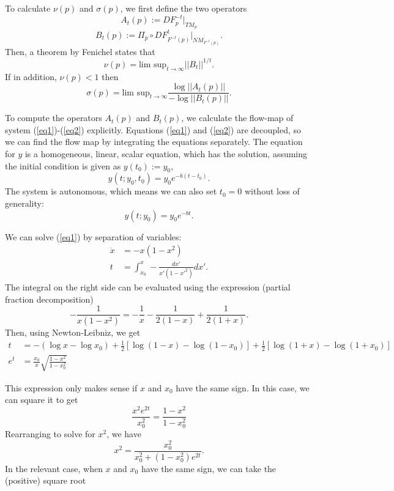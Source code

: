 \documentclass[a4paper,11pt,pdftex]{article}
\begin{document}
To calculate $\nu(p)$ and $\sigma(p)$, we first define the two operators
\begin{equation}
    A_t(p) := DF_p^{-t}|_{TM_p}
\end{equation}
\begin{equation}
    B_t(p) := \Pi_p \circ DF_{F^{-t}(p)}^{t}|_{NM_{F^{-t}(p)}}.
\end{equation}
Then, a theorem by Fenichel states that
\begin{equation}
    \label{eqnu}
    \nu(p) = \text{lim sup}_{t\to \infty} ||B_t||^{1/t}.
\end{equation}
If in addition, $\nu(p)<1$ then
\begin{equation}
    \label{eqsigma}
    \sigma(p) = \text{lim sup}_{t\to \infty} \frac{\log ||A_t(p)||}{-\log ||B_t(p)||}.
\end{equation}

To compute the operators $A_t(p)$ and $B_t(p)$, we calculate the flow-map of system (\ref{eq1})-(\ref{eq2}) explicitly. Equations (\ref{eq1}) and (\ref{eq2}) are decoupled, so we can find the flow map by integrating the equations separately. The equation for $y$ is a homogeneous, linear, scalar equation, which has the solution, assuming the initial condition is given as $y(t_0):= y_0$,
$$
y(t;y_0,t_0) = y_0e^{-b(t-t_0)}.
$$
The system is autonomous, which means we can also set $t_0 = 0$ without loss of generality:
\begin{equation}
\label{eqy}
y(t;y_0) = y_0e^{-bt}.
\end{equation}

We can solve (\ref{eq1}) by separation of variables:
\begin{align*}
    \dot{x} &= -x(1-x^2) \\ 
    t &= \int_{x_0}^{x} -\frac{dx'}{x'(1-x'^2)}d x' .
\end{align*}
    The integral on the right side can be evaluated using the expression (partial fraction decomposition)
    $$
    -\frac{1}{x(1-x^2)} = -\frac{1}{x} - \frac{1}{2(1-x)} + \frac{1}{2(1+x)}.
    $$
Then, using Newton-Leibniz, we get
\begin{align*}
t &= -(\log x - \log x_0) + \frac{1}{2}\left[\log(1-x) - \log(1-x_0)\right] + \frac{1}{2}\left[\log(1+x) - \log(1+x_0)\right ] \\
e^t &= \frac{x_0}{x}\sqrt{\frac{1-x^2}{1-x_0^2}} 
\end{align*}

This expression only makes sense if $x$ and $x_0$ have the same sign. In this case, we can square it to get 
$$
\frac{x^2 e^{2t}}{x_0^2} = \frac{1-x^2}{1-x_0^2}$$
Rearranging to solve for $x^2$, we have
$$
x^2 = \frac{x_0^2}{x_0^2 + (1-x_0^2)e^{2t}}.
$$
In the relevant case, when $x$ and $x_0$ have the same sign, we can take the (positive) square root 
\end{document}

